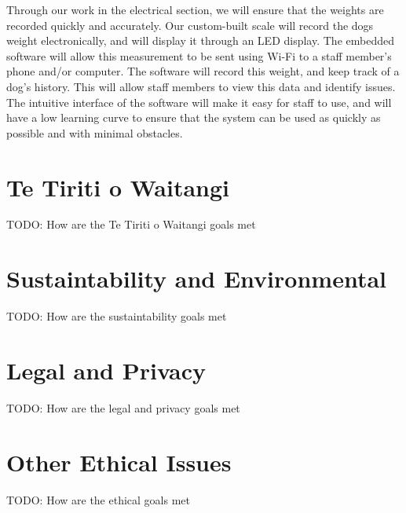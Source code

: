 Through our work in the electrical section, we will ensure that the weights are recorded quickly and accurately. Our custom-built scale will record the dogs weight electronically, and will display it through an LED display. The embedded software will allow this measurement to be sent using Wi-Fi to a staff member’s phone and/or computer. The software will record this weight, and keep track of a dog’s history. This will allow staff members to view this data and identify issues. The intuitive interface of the software will make it easy for staff to use, and will have a low learning curve to ensure that the system can be used as quickly as possible and with minimal obstacles. 


\section{Te Tiriti o Waitangi}

TODO: How are the Te Tiriti o Waitangi goals met

\section{Sustaintability and Environmental}

TODO: How are the sustaintability goals met

\section{Legal and Privacy}

TODO: How are the legal and privacy goals met

\section{Other Ethical Issues}

TODO: How are the ethical goals met

